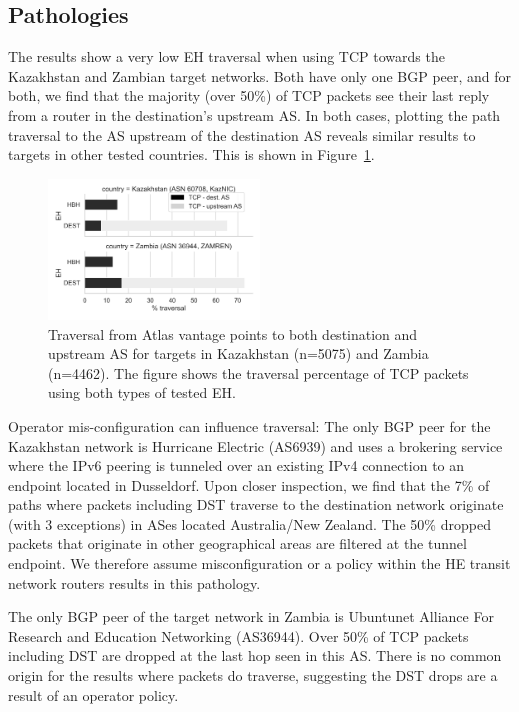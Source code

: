 \documentclass[conference]{IEEEtran}
\begin{document}
\subsection{Pathologies}
    \label{subsec: pathologies}

The results show a very low EH traversal when using TCP towards the Kazakhstan and Zambian target networks. Both have only one BGP peer, and for both, we find that the majority (over 50\%) of TCP packets see their last reply from a router in the destination's upstream AS. In both cases, plotting the path traversal to the AS upstream of the destination AS reveals similar results to targets in other tested countries. This is shown in Figure~\ref{fig:traversal_pathologies}.

\begin{figure}
\centering
  \includegraphics[width=0.5\textwidth]{traversal-pathologies.png}
  \caption{Traversal from Atlas vantage points to both destination and upstream AS for targets in Kazakhstan (n=5075) and Zambia (n=4462). The figure shows the traversal percentage of TCP packets using both types of tested EH.}
  \label{fig:traversal_pathologies}
\end{figure}

Operator mis-configuration can influence traversal: The only BGP peer for the Kazakhstan network is Hurricane Electric (AS6939) and uses a  brokering service where the IPv6 peering is tunneled over an existing IPv4 connection to an endpoint located in Dusseldorf. Upon closer inspection, we find that the 7\% of paths where packets including DST traverse to the destination network originate (with 3 exceptions) in ASes located Australia/New Zealand. The 50\% dropped packets that originate in other geographical areas are filtered at the tunnel endpoint. We therefore assume misconfiguration or a policy within the HE transit network routers results in this pathology. 


The only BGP peer of the target network in Zambia is Ubuntunet Alliance For Research and Education Networking (AS36944). Over 50\% of TCP packets including DST are dropped at the last hop seen in this AS. There is no common origin for the results where packets do traverse, suggesting the DST drops are a result of an operator policy. 
\end{document}
